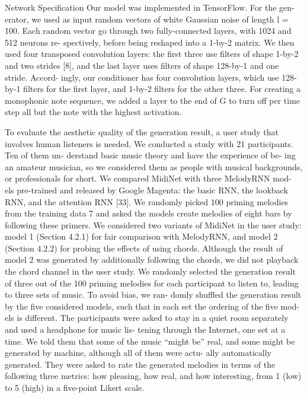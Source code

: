 Network Specification
Our model was implemented in TensorFlow. For the gen- erator, we used as input random vectors of white Gaussian noise of length l = 100. Each random vector go through two fully-connected layers, with 1024 and 512 neurons re- spectively, before being reshaped into a 1-by-2 matrix. We then used four transposed convolution layers: the first three use filters of shape 1-by-2 and two strides [8], and the last layer uses filters of shape 128-by-1 and one stride. Accord- ingly, our conditioner has four convolution layers, which use 128-by-1 filters for the first layer, and 1-by-2 filters for the other three. For creating a monophonic note sequence, we added a layer to the end of G to turn off per time step all but the note with the highest activation.

To evaluate the aesthetic quality of the generation result, a user study that involves human listeners is needed. We conducted a study with 21 participants. Ten of them un- derstand basic music theory and have the experience of be- ing an amateur musician, so we considered them as people with musical backgrounds, or professionals for short. We compared MidiNet with three MelodyRNN mod-
els pre-trained and released by Google Magenta: the basic RNN, the lookback RNN, and the attention RNN [33]. We randomly picked 100 priming melodies from the training data 7 and asked the models create melodies of eight bars by following these primers. We considered two variants of MidiNet in the user study: model 1 (Section 4.2.1) for fair comparison with MelodyRNN, and model 2 (Section 4.2.2) for probing the effects of using chords. Although the result of model 2 was generated by additionally following the chords, we did not playback the chord channel in the user study. We randomly selected the generation result of three out
of the 100 priming melodies for each participant to listen to, leading to three sets of music. To avoid bias, we ran- domly shuffled the generation result by the five considered models, such that in each set the ordering of the five mod- els is different. The participants were asked to stay in a quiet room separately and used a headphone for music lis- tening through the Internet, one set at a time. We told them that some of the music “might be” real, and some might be generated by machine, although all of them were actu- ally automatically generated. They were asked to rate the generated melodies in terms of the following three metrics: how pleasing, how real, and how interesting, from 1 (low) to 5 (high) in a five-point Likert scale.


